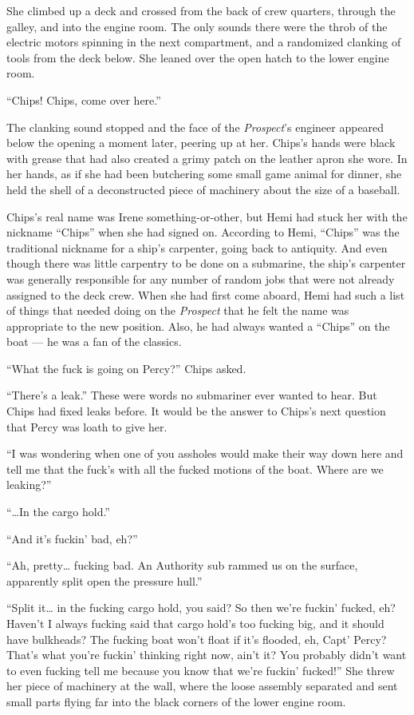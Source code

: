 \documentclass[
]{scrbook}
\begin{document}
She climbed up a deck and crossed from the back of crew quarters,
through the galley, and into the engine room. The only sounds there were
the throb of the electric motors spinning in the next compartment, and a
randomized clanking of tools from the deck below. She leaned over the
open hatch to the lower engine room.

``Chips! Chips, come over here.''

The clanking sound stopped and the face of the \emph{Prospect}'s
engineer appeared below the opening a moment later, peering up at her.
Chips's hands were black with grease that had also created a grimy patch
on the leather apron she wore. In her hands, as if she had been
butchering some small game animal for dinner, she held the shell of a
deconstructed piece of machinery about the size of a baseball.

Chips's real name was Irene something-or-other, but Hemi had stuck her
with the nickname ``Chips'' when she had signed on. According to Hemi,
``Chips'' was the traditional nickname for a ship's carpenter, going
back to antiquity. And even though there was little carpentry to be done
on a submarine, the ship's carpenter was generally responsible for any
number of random jobs that were not already assigned to the deck crew.
When she had first come aboard, Hemi had such a list of things that
needed doing on the \emph{Prospect} that he felt the name was
appropriate to the new position. Also, he had always wanted a ``Chips''
on the boat --- he was a fan of the classics.

``What the fuck is going on Percy?'' Chips asked.

``There's a leak.'' These were words no submariner ever wanted to hear.
But Chips had fixed leaks before. It would be the answer to Chips's next
question that Percy was loath to give her.

``I was wondering when one of you assholes would make their way down
here and tell me that the fuck's with all the fucked motions of the
boat. Where are we leaking?''

``\ldots In the cargo hold.''

``And it's fuckin' bad, eh?''

``Ah, pretty\ldots{} fucking bad. An Authority sub rammed us on the
surface, apparently split open the pressure hull.''

``Split it\ldots{} in the fucking cargo hold, you said? So then we're
fuckin' fucked, eh? Haven't I always fucking said that cargo hold's too
fucking big, and it should have bulkheads? The fucking boat won't float
if it's flooded, eh, Capt' Percy? That's what you're fuckin' thinking
right now, ain't it? You probably didn't want to even fucking tell me
because you know that we're fuckin' fucked!'' She threw her piece of
machinery at the wall, where the loose assembly separated and sent small
parts flying far into the black corners of the lower engine room.
\end{document}

